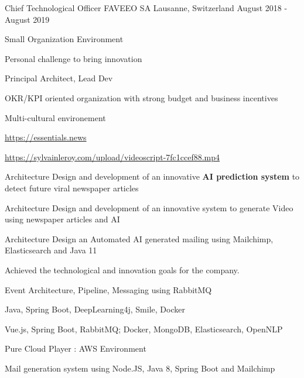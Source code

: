 \begin{cventries}
    \cventry
    {Chief Technological Officer} %
    {FAVEEO SA} %
    {Lausanne, Switzerland} %
    {August 2018 - August 2019} %
    {
        \experience
        {
            \begin{cvitems} %
                \item{Small Organization Environment}
                \item{Personal challenge to bring innovation}
                \item{Principal Architect, Lead Dev}
                \item{OKR/KPI oriented organization with strong budget and business incentives }
                \item{Multi-cultural environement}
            \end{cvitems}
        }
        {
           \begin{cvitems} %
                \item{\url{https://essentials.news}}
                \item{\url{https://sylvainleroy.com/upload/videoscript-7fc1ccef88.mp4}}
                \item{Architecture Design and development of an innovative \textbf{AI prediction system} to detect future viral newspaper articles}
                \item{Architecture Design and development of an innovative system to generate Video using newspaper articles and AI}
                \item{Architecture Design an Automated AI generated mailing using Mailchimp, Elasticsearch and Java 11}
                \item{Achieved the technological and innovation goals for the company.}
            \end{cvitems}
        }
        {
            \begin{cvitems} %
                \item{Event Architecture, Pipeline, Messaging using RabbitMQ}
                \item{Java, Spring Boot, DeepLearning4j, Smile, Docker}
                \item{Vue.js, Spring Boot, RabbitMQ; Docker, MongoDB, Elasticsearch, OpenNLP}
                \item{Pure Cloud Player : AWS Environment}
                \item{Mail generation system using Node.JS, Java 8, Spring Boot and Mailchimp}

\end{cvitems}}}
\end{cventries}
